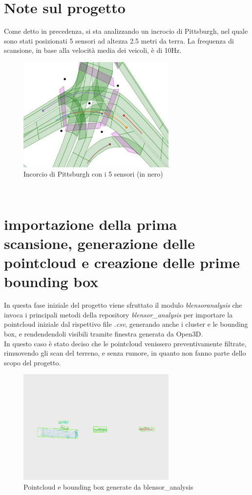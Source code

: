 \documentclass[italian]{report}
\begin{document}
\section{Note sul progetto}
Come detto in precedenza, si sta analizzando un incrocio di Pittsburgh, nel quale sono stati posizionati 5 sensori ad altezza 2.5 metri da terra. La frequenza di scansione, in base alla velocità media dei veicoli, è di 10Hz.
\begin{figure}[H]
	\centering
	\includegraphics[width=0.7\textwidth]{junction_sensors}
	\footnotesize
	\caption{Incorcio di Pittsburgh con i 5 sensori (in nero)}
\end{figure}\\
\section{importazione della prima scansione, generazione delle pointcloud e creazione delle prime bounding box}
In questa fase iniziale del progetto viene sfruttato il modulo \textit{blensoranalysis} che invoca i principali metodi della repository \textit{blensor\_analysis} per importare la pointcloud iniziale dal rispettivo file \textit{.csv}, generando anche i cluster e le bounding box, e rendendendoli visibili tramite finestra generata da Open3D.\\
In questo caso è stato deciso che le pointcloud venissero preventivamente filtrate, rimuovendo gli scan del terreno, e senza rumore, in quanto non fanno parte dello scopo del progetto.
\begin{figure}[H]
	\centering
	\includegraphics[width=0.7\textwidth]{blensor_analysis}
	\footnotesize
	\caption{Pointcloud e bounding box generate da blensor\_analysis}
\end{figure}\\
\end{document}
